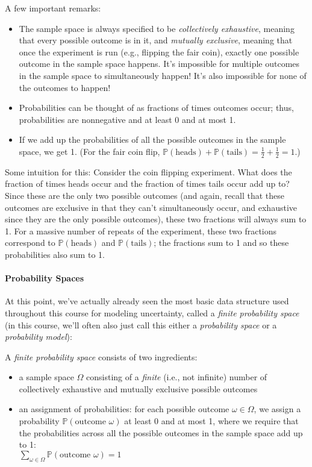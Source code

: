 \documentclass[6008notes.tex]{subfiles}
\begin{document}
A few important remarks:
\begin{itemize}
\item The sample space is always specified to be \textit{collectively exhaustive}, meaning that every possible outcome is in it, and \textit{mutually exclusive}, meaning that once the experiment is run (e.g., flipping the fair coin), exactly one possible outcome in the sample space happens. It's impossible for multiple outcomes in the sample space to simultaneously happen! It's also impossible for none of the outcomes to happen!

\item Probabilities can be thought of as fractions of times outcomes occur; thus, probabilities are nonnegative and at least 0 and at most 1.

\item If we add up the probabilities of all the possible outcomes in the sample space, we get 1.
(For the fair coin flip, $\mathbb {P}(\text {heads})+\mathbb {P}(\text {tails})=\frac{1}{2}+\frac{1}{2}=1$.)
\end{itemize}

Some intuition for this: Consider the coin flipping experiment. What does the fraction of times heads occur and the fraction of times tails occur add up to? Since these are the only two possible outcomes (and again, recall that these outcomes are exclusive in that they can't simultaneously occur, and exhaustive since they are the only possible outcomes), these two fractions will always sum to 1. For a massive number of repeats of the experiment, these two fractions correspond to $\mathbb {P}(\text {heads})$ and $\mathbb {P}(\text {tails})$; the fractions sum to 1 and so these probabilities also sum to 1.

\paragraph{Probability Spaces}

At this point, we've actually already seen the most basic data structure used throughout this course for modeling uncertainty, called a \textit{finite probability space} (in this course, we'll often also just call this either a \textit{probability space} or a \textit{probability model}):

A \textit{finite probability space} consists of two ingredients:
\begin{itemize}
 \item a sample space $\Omega$ consisting of a \textit{finite} (i.e., not infinite) number of collectively exhaustive and mutually exclusive possible outcomes

\item an assignment of probabilities: for each possible outcome $\omega \in \Omega$, we assign a probability $\mathbb {P}(\text {outcome }\omega )$ at least 0 and at most 1, where we require that the probabilities across all the possible outcomes in the sample space add up to 1:\\
$\sum _{\omega \in \Omega }\mathbb {P}(\text {outcome }\omega )=1$
\end{itemize}
\end{document}
